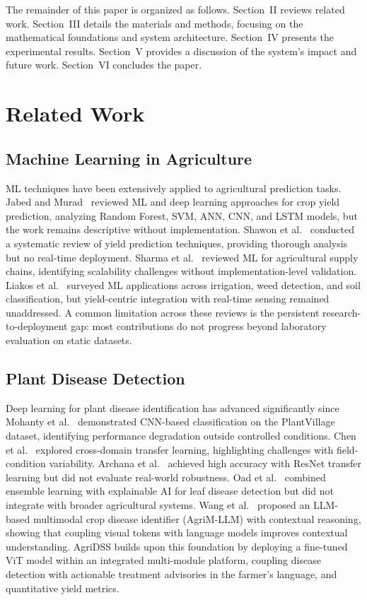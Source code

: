 \documentclass[conference]{IEEEtran}
\begin{document}
The remainder of this paper is organized as follows. Section~II reviews related work. Section~III details the materials and methods, focusing on the mathematical foundations and system architecture. Section~IV presents the experimental results. Section~V provides a discussion of the system's impact and future work. Section~VI concludes the paper.

\section{Related Work}

\subsection{Machine Learning in Agriculture}

ML techniques have been extensively applied to agricultural prediction tasks. Jabed and Murad~\cite{b6} reviewed ML and deep learning approaches for crop yield prediction, analyzing Random Forest, SVM, ANN, CNN, and LSTM models, but the work remains descriptive without implementation. Shawon et al.~\cite{b9} conducted a systematic review of yield prediction techniques, providing thorough analysis but no real-time deployment. Sharma et al.~\cite{b7} reviewed ML for agricultural supply chains, identifying scalability challenges without implementation-level validation. Liakos et al.~\cite{b8} surveyed ML applications across irrigation, weed detection, and soil classification, but yield-centric integration with real-time sensing remained unaddressed. A common limitation across these reviews is the persistent research-to-deployment gap: most contributions do not progress beyond laboratory evaluation on static datasets.

\subsection{Plant Disease Detection}

Deep learning for plant disease identification has advanced significantly since Mohanty et al.~\cite{b12} demonstrated CNN-based classification on the PlantVillage dataset, identifying performance degradation outside controlled conditions. Chen et al.~\cite{b13} explored cross-domain transfer learning, highlighting challenges with field-condition variability. Archana et al.~\cite{b11} achieved high accuracy with ResNet transfer learning but did not evaluate real-world robustness. Oad et al.~\cite{b14} combined ensemble learning with explainable AI for leaf disease detection but did not integrate with broader agricultural systems. Wang et al.~\cite{b15} proposed an LLM-based multimodal crop disease identifier (AgriM-LLM) with contextual reasoning, showing that coupling visual tokens with language models improves contextual understanding. AgriDSS builds upon this foundation by deploying a fine-tuned ViT model within an integrated multi-module platform, coupling disease detection with actionable treatment advisories in the farmer's language, and quantitative yield metrics.
\end{document}
